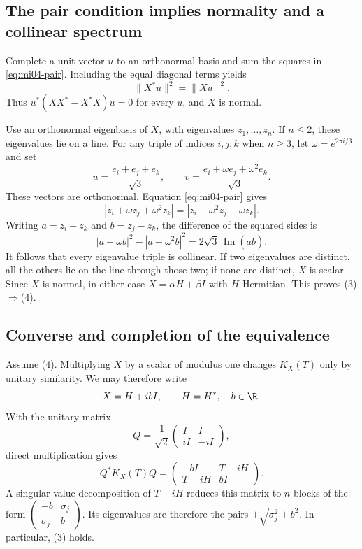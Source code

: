 \subsection{The pair condition implies normality and a collinear spectrum}

Complete a unit vector $u$ to an orthonormal basis and sum the squares in \eqref{eq:mi04-pair}. Including the equal diagonal terms yields
\[
 \|X^*u\|^2=\|Xu\|^2.
\]
Thus $u^*(XX^*-X^*X)u=0$ for every $u$, and $X$ is normal.

Use an orthonormal eigenbasis of $X$, with eigenvalues $z_1,\ldots,z_n$. If $n\leq2$, these eigenvalues lie on a line. For any triple of indices $i,j,k$ when $n\geq3$, let $\omega=e^{2\pi i/3}$ and set
\[
 u=\frac{e_i+e_j+e_k}{\sqrt3},\qquad
 v=\frac{e_i+\omega e_j+\omega^2e_k}{\sqrt3}.
\]
These vectors are orthonormal. Equation \eqref{eq:mi04-pair} gives
\[
 |z_i+\omega z_j+\omega^2z_k|
 =|z_i+\omega^2z_j+\omega z_k|.
\]
Writing $a=z_i-z_k$ and $b=z_j-z_k$, the difference of the squared sides is
\[
 |a+\omega b|^2-|a+\omega^2b|^2
 =2\sqrt3\,\operatorname{Im}(a\overline b).
\]
It follows that every eigenvalue triple is collinear. If two eigenvalues are distinct, all the others lie on the line through those two; if none are distinct, $X$ is scalar. Since $X$ is normal, in either case $X=\alpha H+\beta I$ with $H$ Hermitian. This proves (3)$\Rightarrow$(4).

\subsection{Converse and completion of the equivalence}

Assume (4). Multiplying $X$ by a scalar of modulus one changes $K_X(T)$ only by unitary similarity. We may therefore write
\[
 X=H+ibI,\qquad H=H^*,\quad b\in\R.
\]
With the unitary matrix
\[
 Q=\frac1{\sqrt2}\begin{pmatrix}I&I\\ iI&-iI\end{pmatrix},
\]
direct multiplication gives
\[
 Q^*K_X(T)Q
 =\begin{pmatrix}-bI&T-iH\\T+iH&bI\end{pmatrix}.
\]
A singular value decomposition of $T-iH$ reduces this matrix to $n$ blocks of the form
$\begin{pmatrix}-b&\sigma_j\\\sigma_j&b\end{pmatrix}$.
Its eigenvalues are therefore the pairs
$\pm\sqrt{\sigma_j^2+b^2}$. In particular, (3) holds.

